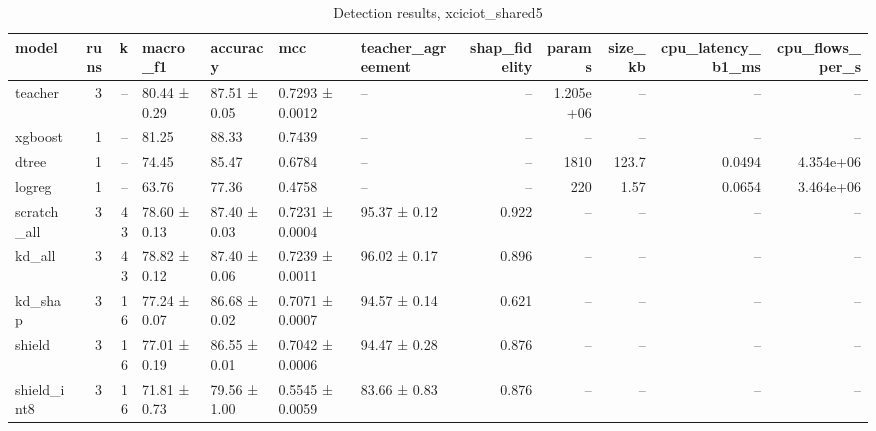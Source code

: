 \begin{table}
\caption{Detection results, xciciot_shared5}
\begin{tabular}{lrrllllrrrrr}
\toprule
model & runs & k & macro_f1 & accuracy & mcc & teacher_agreement & shap_fidelity & params & size_kb & cpu_latency_b1_ms & cpu_flows_per_s \\
\midrule
teacher & 3 & -- & 80.44 ± 0.29 & 87.51 ± 0.05 & 0.7293 ± 0.0012 & -- & -- & 1.205e+06 & -- & -- & -- \\
xgboost & 1 & -- & 81.25 & 88.33 & 0.7439 & -- & -- & -- & -- & -- & -- \\
dtree & 1 & -- & 74.45 & 85.47 & 0.6784 & -- & -- & 1810 & 123.7 & 0.0494 & 4.354e+06 \\
logreg & 1 & -- & 63.76 & 77.36 & 0.4758 & -- & -- & 220 & 1.57 & 0.0654 & 3.464e+06 \\
scratch_all & 3 & 43 & 78.60 ± 0.13 & 87.40 ± 0.03 & 0.7231 ± 0.0004 & 95.37 ± 0.12 & 0.922 & -- & -- & -- & -- \\
kd_all & 3 & 43 & 78.82 ± 0.12 & 87.40 ± 0.06 & 0.7239 ± 0.0011 & 96.02 ± 0.17 & 0.896 & -- & -- & -- & -- \\
kd_shap & 3 & 16 & 77.24 ± 0.07 & 86.68 ± 0.02 & 0.7071 ± 0.0007 & 94.57 ± 0.14 & 0.621 & -- & -- & -- & -- \\
shield & 3 & 16 & 77.01 ± 0.19 & 86.55 ± 0.01 & 0.7042 ± 0.0006 & 94.47 ± 0.28 & 0.876 & -- & -- & -- & -- \\
shield_int8 & 3 & 16 & 71.81 ± 0.73 & 79.56 ± 1.00 & 0.5545 ± 0.0059 & 83.66 ± 0.83 & 0.876 & -- & -- & -- & -- \\
\bottomrule
\end{tabular}
\end{table}
